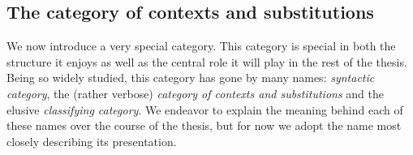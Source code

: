 \documentclass[12pt,twoside]{reedthesis}
\theoremstyle{definition}
\theoremstyle{remark}
\theoremstyle{theorem}
\begin{document}


\subsection{The category of contexts and substitutions}
We now introduce a very special category. This category is special in both the
structure it enjoys as well as the central role it will play in the rest of the
thesis. Being so widely studied, this category has gone by many names:
\emph{syntactic category}, the (rather verbose) \emph{category of contexts and
  substitutions} and the elusive \emph{classifying category}. We endeavor to
explain the meaning behind each of these names over the course of the thesis,
but for now we adopt the name most closely describing its presentation.

\newcommand{\id}{\text{id}} %
\end{document}
